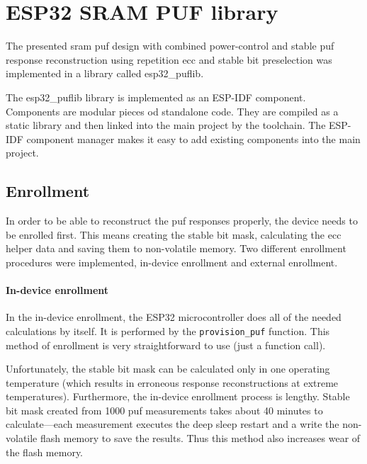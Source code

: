 \chapter{ESP32 SRAM PUF library}\label{sec:puflib}

The presented \gls{sram} \gls{puf} design with combined power-control and stable \gls{puf} response reconstruction using repetition \gls{ecc} and stable bit preselection was implemented in a library called esp32\_puflib. 

The esp32\_puflib library is implemented as an ESP-IDF component. Components are modular pieces od standalone code. They are compiled as a static library and then linked into the main project by the toolchain. The ESP-IDF component manager makes it easy to add existing components into the main project.\cite{espidf2022}

\section{Enrollment}

In order to be able to reconstruct the \gls{puf} responses properly, the device needs to be enrolled first. This means creating the stable bit mask, calculating the \gls{ecc} helper data and saving them to non-volatile memory. Two different enrollment procedures were implemented, in-device enrollment and external enrollment.

\subsubsection*{In-device enrollment}

In the in-device enrollment, the ESP32 microcontroller does all of the needed calculations by itself. It is performed by the \lstinline{provision_puf} function. This method of enrollment is very straightforward to use (just a function call).

Unfortunately, the stable bit mask can be calculated only in one operating temperature (which results in erroneous response reconstructions at extreme temperatures). Furthermore, the in-device enrollment process is lengthy. Stable bit mask created from 1000 \gls{puf} measurements takes about 40 minutes to calculate---each measurement executes the deep sleep restart and a write the non-volatile flash memory to save the results. Thus this method also increases wear of the flash memory.

